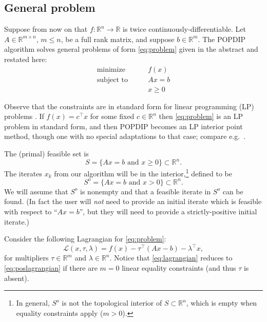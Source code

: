 \documentclass[11pt]{article}
\newcommand{\RR}{\mathbb{R}}
\begin{document}
\subsection*{General problem}

Suppose from now on that $f:\RR^n \to \RR$ is twice continuously-differentiable.  Let $A\in\RR^{m\times n}$, $m\le n$, be a full rank matrix, and suppose $b\in\RR^m$.  The POPDIP algorithm solves general problems of form \eqref{eq:problem} given in the abstract and restated here:
\begin{equation}
\begin{matrix}
\text{minimize} \qquad   & f(x) \\
\text{subject to} \qquad & A x = b \\
                         & x \ge 0
\end{matrix} \tag{1}
\end{equation}

Observe that the constraints are in standard form for linear programming (LP) problems \cite[chapter 4]{GrivaNashSofer2009}.  If $f(x)=c^\top x$ for some fixed $c\in\RR^n$ then \eqref{eq:problem} is an LP problem in standard form, and then POPDIP becomes an LP interior point method, though one with no special adaptations to that case; compare e.g.~\cite{ZhangTapiaDennis1992}.

The (primal) feasible set is
\begin{equation}
S = \{Ax=b \text{ and } x\ge 0\} \subset \RR^n.  \label{eq:primalfeasible}
\end{equation}
The iterates $x_k$ from our algorithm will be in the interior,\footnote{In general, $S^o$ is not the topological interior of $S \subset \RR^n$, which is empty when equality constraints apply ($m>0$).} defined to be
\begin{equation}
S^o = \{Ax=b \text{ and } x > 0\} \subset \RR^n.  \label{eq:primalinterior}
\end{equation}
We will assume that $S^o$ is nonempty and that a feasible iterate in $S^o$ can be found.  (In fact the user will \emph{not} need to provide an initial iterate which is feasible with respect to ``$Ax=b$'', but they will need to provide a strictly-positive initial iterate.)

Consider the following Lagrangian for \eqref{eq:problem}:
\begin{equation}
\mathcal{L}(x,\tau,\lambda) = f(x) - \tau^\top (Ax - b) - \lambda^\top x, \label{eq:lagrangian}
\end{equation}
for multipliers $\tau\in\RR^m$ and $\lambda\in \RR^n$.  Notice that \eqref{eq:lagrangian} reduces to \eqref{eq:poslagrangian} if there are $m=0$ linear equality constraints (and thus $\tau$ is absent).
\end{document}
